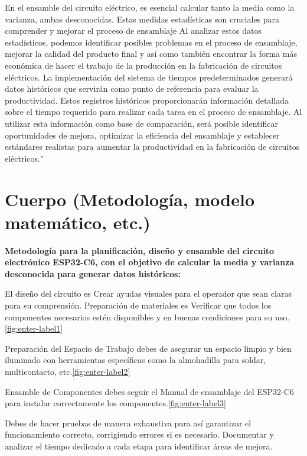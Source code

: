     En el ensamble del circuito eléctrico, es esencial calcular tanto la media como la varianza, ambas desconocidas. Estas medidas estadísticas son cruciales para comprender y mejorar el proceso de ensamblaje Al analizar estos datos estadísticos, podemos identificar posibles problemas en el proceso de ensamblaje, mejorar la calidad del producto final y así como también encontrar la forma más económica de hacer el trabajo de la producción en la fabricación de circuitos eléctricos.
    La implementación del sistema de tiempos predeterminados generará datos históricos que servirán como punto de referencia para evaluar la productividad. Estos registros históricos proporcionarán información detallada sobre el tiempo requerido para realizar cada tarea en el proceso de ensamblaje. Al utilizar esta información como base de comparación, será posible identificar oportunidades de mejora, optimizar la eficiencia del ensamblaje y establecer estándares realistas para aumentar la productividad en la fabricación de circuitos eléctricos."
    \section{Cuerpo (Metodología, modelo matemático, etc.)}
    
    \textbf{Metodología para la planificación, diseño y ensamble del circuito electrónico ESP32-C6, con el objetivo de calcular la media y varianza desconocida para generar datos históricos:}
    
    El diseño del circuito es Crear ayudas visuales para el operador que sean claras para su comprensión.
    Preparación de materiales es Verificar que todos los componentes necesarios estén disponibles y en buenas condiciones para su uso.
    \ref{fig:enter-label1}
    
    Preparación del Espacio de Trabajo debes de asegurar un espacio limpio y bien iluminado con herramientas específicas como la almohadilla para soldar, multicontacto, etc.\ref{fig:enter-label2} 
    
    Ensamble de Componentes debes seguir el Manual de ensamblaje del ESP32-C6 para instalar correctamente los componentes.\ref{fig:enter-label3}
    
    Debes de hacer pruebas de manera exhaustiva para así garantizar el funcionamiento correcto, corrigiendo errores si es necesario.
    Documentar y analizar el tiempo dedicado a cada etapa para identificar áreas de mejora.
    
